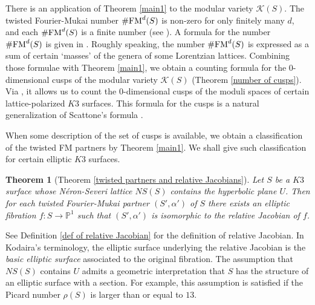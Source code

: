 \documentclass{article}
\theoremstyle{plain}
\newtheorem{theorem}{Theorem}[section]
\theoremstyle{definition}
\theoremstyle{remark}
\newcommand{\proj}{{\mathbb P}}
\begin{document}
There is an application of Theorem \ref{main1}  
to the modular variety 
$\mathcal{K} (S)$.   
The twisted Fourier-Mukai number $\# {\rm FM\/}^{d}(S)$ is non-zero for only finitely many $d$,  
and each $\# {\rm FM\/}^{d}(S)$ is a finite number (see \cite{H-S1}).   
A formula for the number $\# {\rm FM\/}^{d}(S)$ is given in \cite{Ma2}. 
Roughly speaking, 
the number $\# {\rm FM\/}^{d}(S)$ is expressed 
as a sum of 
certain `masses' of the genera of some Lorentzian lattices.  
Combining those formulae with Theorem \ref{main1}, 
we obtain a counting formula 
for the $0$-dimensional cusps of 
the modular variety 
$\mathcal{K} (S)$ (Theorem \ref{number of cusps}). 
Via \cite{Do}, 
it allows us to 
count the $0$-dimensional cusps of the moduli spaces of 
certain lattice-polarized $K3$ surfaces.  
This formula for the cusps is a natural generalization of Scattone's formula \cite{Sc}.  
  



When some description of the set of cusps is available, 
we obtain a classification of the twisted FM partners by Theorem \ref{main1}.  
We shall give such classification for certain elliptic $K3$ surfaces.  


\begin{theorem}[Theorem \ref{twisted partners and relative Jacobians}]\label{main2}
Let $S$ be a $K3$ surface  
whose N\'eron-Severi lattice $NS(S)$ contains the hyperbolic plane $U$. 
Then 
for each twisted Fourier-Mukai partner $(S', \alpha ')$ of $S$ 
there exists an elliptic fibration $f : S \to  {\proj}^{1}$ such that
$(S', \alpha ')$ is isomorphic to 
the relative Jacobian of $f$. 
\end{theorem}


See Definition \ref{def of relative Jacobian} for the definition of relative Jacobian.  
In Kodaira's terminology, 
the elliptic surface underlying the relative Jacobian is 
the {\it basic elliptic surface\/} associated to the original fibration. 
The assumption that 
$NS(S)$ contains $U$ 
admits a geometric interpretation  
that $S$ has the structure of an elliptic surface with a section. 
For example, 
this assumption is satisfied 
if the Picard number $\rho (S)$ is larger than or equal to $13$. 
\end{document}
